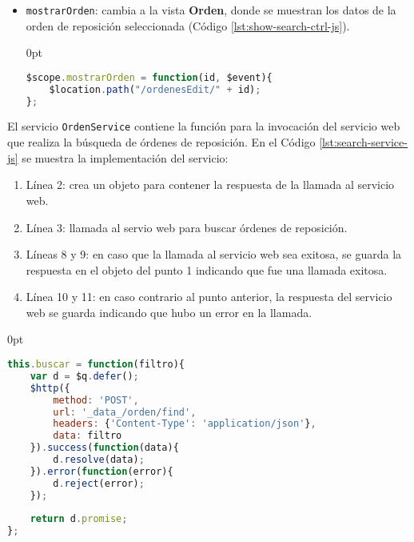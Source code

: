 \begin{enumerate}
\begin{itemize}
\begin{adjustwidth}{\listingfixlargewidth}{0pt}
\begin{lstlisting}[language=Javascript, caption={Función para llamar el servicio de búsqueda de órdenes de reposición.}, captionpos=b, label={lst:find-serach-ctrl-js}]
$scope.buscar = function($event){
	var promise = OrdenService.buscar($scope.filtro);
	promise.then(function(data){
		$scope.ordenes = data;
	});
};
\end{lstlisting}
\end{adjustwidth}
	\item \texttt{mostrarOrden}: cambia a la vista \textbf{Orden}, donde se muestran los datos de la orden de reposición seleccionada (Código \ref{lst:show-search-ctrl-js}).
\begin{adjustwidth}{\listingfixlargewidth}{0pt}
\begin{lstlisting}[language=Javascript, caption={Función para mostrar la vista de una orden de reposición.}, captionpos=b, label={lst:show-search-ctrl-js}]
$scope.mostrarOrden = function(id, $event){
	$location.path("/ordenesEdit/" + id);
};
\end{lstlisting}
\end{adjustwidth}
\end{itemize}
El servicio \texttt{OrdenService} contiene la función para la invocación del servicio web que realiza la búsqueda de órdenes de reposición. En el Código \ref{lst:search-service-js} se muestra la implementación del servicio:
\begin{enumerate}
	\item Línea 2: crea un objeto para contener la respuesta de la llamada al servicio web.
	\item Línea 3: llamada al servio web para buscar órdenes de reposición.
	\item Líneas 8 y 9: en caso que la llamada al servicio web sea exitosa, se guarda la respuesta en el objeto del punto 1 indicando que fue una llamada exitosa.
	\item Línea 10 y 11: en caso contrario al punto anterior, la respuesta del servicio web se guarda indicando que hubo un error en la llamada.
\end{enumerate}
\begin{adjustwidth}{\listingfixwidth}{0pt}
\begin{lstlisting}[language=Javascript, caption={Servicio de \textit{AngularJS} para buscar órdenes de reposición.}, captionpos=b, label={lst:search-service-js}]
this.buscar = function(filtro){
	var d = $q.defer();
	$http({
		method: 'POST',
		url: '_data_/orden/find',
		headers: {'Content-Type': 'application/json'},
		data: filtro
	}).success(function(data){
		d.resolve(data);
	}).error(function(error){
		d.reject(error);
	});
	
	return d.promise;
};
\end{lstlisting}
\end{adjustwidth}

\end{enumerate}
